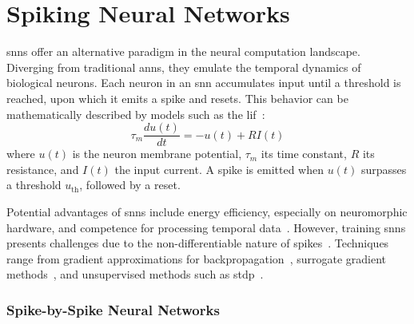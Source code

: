 \section{Spiking Neural Networks}

\glspl{snn} offer an alternative paradigm in the neural computation landscape. Diverging from traditional \glspl{ann}, they emulate the temporal dynamics of biological neurons. Each neuron in an \gls{snn} accumulates input until a threshold is reached, upon which it emits a spike and resets. This behavior can be mathematically described by models such as the \gls{lif}~\cite{gerstner2014neuronal}:
\begin{equation}
\tau_m \frac{du(t)}{dt} = -u(t) + RI(t)
\end{equation}
where \( u(t) \) is the neuron membrane potential, \( \tau_m \) its time constant, \( R \) its resistance, and \( I(t) \) the input current. A spike is emitted when \( u(t) \) surpasses a threshold \( u_{\text{th}} \), followed by a reset.

Potential advantages of \glspl{snn} include energy efficiency, especially on neuromorphic hardware, and competence for processing temporal data~\cite{merolla2014million}. However, training \glspl{snn} presents challenges due to the non-differentiable nature of spikes~\cite{neftci2019surrogate}. Techniques range from gradient approximations for backpropagation~\cite{lee2016training}, surrogate gradient methods~\cite{neftci2019surrogate}, and unsupervised methods such as \gls{stdp}~\cite{masquelier2007unsupervised}.

\subsubsection{Spike-by-Spike Neural Networks} 

\label{sec:sbs}

